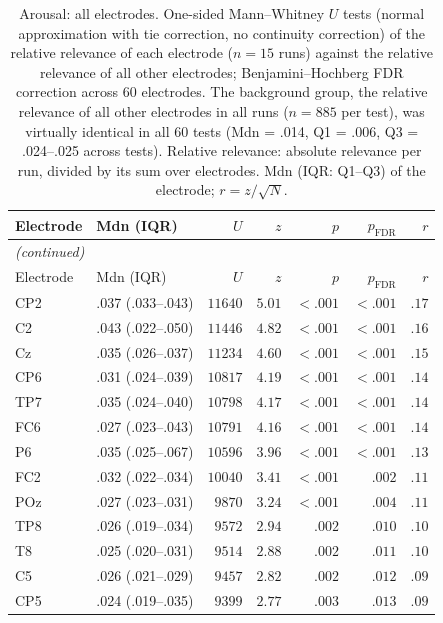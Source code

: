 {\small\setlength{\tabcolsep}{4pt}
\begin{longtable}{llrrrrr}
\caption{Arousal: all electrodes. One-sided Mann--Whitney $U$ tests (normal approximation with tie correction, no continuity correction) of the relative relevance of each electrode ($n = 15$ runs) against the relative relevance of all other electrodes; Benjamini--Hochberg FDR correction across 60 electrodes. The background group, the relative relevance of all other electrodes in all runs ($n = 885$ per test), was virtually identical in all 60 tests (Mdn = .014, Q1 = .006, Q3 = .024--.025 across tests). Relative relevance: absolute relevance per run, divided by its sum over electrodes. Mdn (IQR: Q1--Q3) of the electrode; $r = z / \sqrt{N}$.}\label{tab:arousal_electrode_mwu_all} \\
\toprule
Electrode & Mdn (IQR) & $U$ & $z$ & $p$ & $p_{\mathrm{FDR}}$ & $r$ \\
\midrule
\endfirsthead
\multicolumn{7}{l}{\emph{(continued)}} \\
\toprule
Electrode & Mdn (IQR) & $U$ & $z$ & $p$ & $p_{\mathrm{FDR}}$ & $r$ \\
\midrule
\endhead
\bottomrule
\endfoot
CP2 & .037 (.033--.043) & $11640$ & $5.01$ & $< .001$ & $< .001$ & $.17$ \\
C2 & .043 (.022--.050) & $11446$ & $4.82$ & $< .001$ & $< .001$ & $.16$ \\
Cz & .035 (.026--.037) & $11234$ & $4.60$ & $< .001$ & $< .001$ & $.15$ \\
CP6 & .031 (.024--.039) & $10817$ & $4.19$ & $< .001$ & $< .001$ & $.14$ \\
TP7 & .035 (.024--.040) & $10798$ & $4.17$ & $< .001$ & $< .001$ & $.14$ \\
FC6 & .027 (.023--.043) & $10791$ & $4.16$ & $< .001$ & $< .001$ & $.14$ \\
P6 & .035 (.025--.067) & $10596$ & $3.96$ & $< .001$ & $< .001$ & $.13$ \\
FC2 & .032 (.022--.034) & $10040$ & $3.41$ & $< .001$ & $.002$ & $.11$ \\
POz & .027 (.023--.031) & $9870$ & $3.24$ & $< .001$ & $.004$ & $.11$ \\
TP8 & .026 (.019--.034) & $9572$ & $2.94$ & $.002$ & $.010$ & $.10$ \\
T8 & .025 (.020--.031) & $9514$ & $2.88$ & $.002$ & $.011$ & $.10$ \\
C5 & .026 (.021--.029) & $9457$ & $2.82$ & $.002$ & $.012$ & $.09$ \\
CP5 & .024 (.019--.035) & $9399$ & $2.77$ & $.003$ & $.013$ & $.09$ \\

\end{longtable}}
